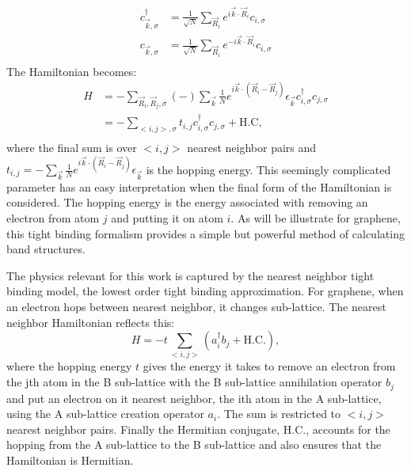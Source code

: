 \begin{align*}
	c^{\dagger}_{\vec{k},\sigma}&=\frac{1}{\sqrt{N}}\sum_{\vec{R}_i} e^{ i \vec{k} \cdot \vec{R}_i} c_{i,\sigma} \\
	c          _{\vec{k},\sigma}&=\frac{1}{\sqrt{N}}\sum_{\vec{R}_i} e^{-i \vec{k} \cdot \vec{R}_i} c_{i,\sigma} \\
\end{align*}
The Hamiltonian becomes:
\begin{align*}
	H&=-\sum_{\vec{R}_i, \vec{R}_j,\sigma} (-) \sum_{\vec{k}}\frac{1}{N} e^{i \vec{k} \cdot (\vec{R}_i-\vec{R}_j)}
	 \epsilon_{\vec{k}} c^{\dagger}_{i,\sigma} c_{j,\sigma} \\
	 &=-\sum_{<i,j>,\sigma} t_{i,j} c^{\dagger}_{i,\sigma} c_{j,\sigma} + \text{H.C},\\
\end{align*}
where the final sum is over $<i,j>$ nearest neighbor pairs and $t_{i,j}=-\sum_{\vec{k}}\frac{1}{N} e^{i \vec{k} \cdot (\vec{R}_i-\vec{R}_j)}\epsilon_{\vec{k}}$ is the hopping energy.
This seemingly complicated parameter has an easy interpretation when the final form of the Hamiltonian is considered.
The hopping energy is the energy associated with removing an electron from atom $j$ and putting it on atom $i$.
As will be illustrate for graphene, this tight binding formalism provides a simple but powerful method of calculating band structures.

The physics relevant for this work is captured by the nearest neighbor tight binding model, the lowest order tight binding approximation.
For graphene, when an electron hops between nearest neighbor, it changes sub-lattice.
The nearest neighbor Hamiltonian reflects this:
\begin{equation}
	H=-t \sum_{<i,j>} (a_i^{\dagger} b_j + \text{H.C.}),
	\label{eq:TB:baseham}
\end{equation}
where the hopping energy $t$ gives the energy it takes to remove an electron from the jth atom in the B sub-lattice with the B sub-lattice annihilation operator $b_j$ and put an electron on it nearest neighbor, the ith atom in the A sub-lattice, using the A sub-lattice creation operator $a_i$.
The sum is restricted to $<i,j>$ nearest neighbor pairs.
Finally the Hermitian conjugate, $\text{H.C.}$, accounts for the hopping from the A sub-lattice to the B sub-lattice and also ensures that the Hamiltonian is Hermitian.

